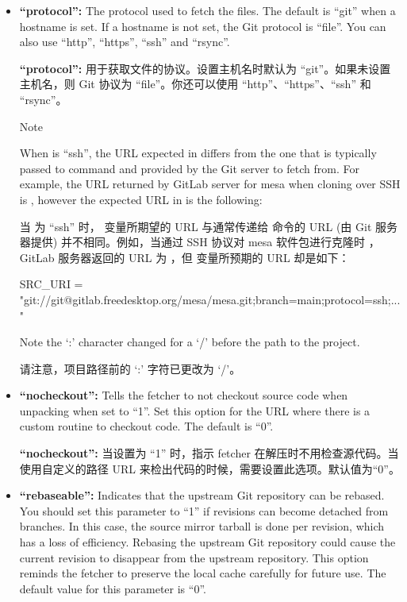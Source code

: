 \begin{itemize}
\setlength\itemsep{1.0em}
\item \textbf{``protocol'':} The protocol used to fetch the files. The default is ``git'' when a hostname is set. If a hostname is not set, the Git protocol is ``file''. You can also use ``http'', ``https'', ``ssh'' and ``rsync''.

\medskip
\textbf{``protocol'':} 用于获取文件的协议。设置主机名时默认为 ``git''。如果未设置主机名，则 Git 协议为 ``file''。你还可以使用 ``http''、``https''、``ssh'' 和 ``rsync''。

\medskip
\begin{noteblock}{Note}%

When  is ``ssh'', the URL expected in  differs from the one that is typically passed to  command and provided by the Git server to fetch from. For example, the URL returned by GitLab server for mesa when cloning over SSH is , however the expected URL in  is the following:

\medskip
当  为 ``ssh'' 时，  变量所期望的 URL 与通常传递给  命令的 URL (由 Git 服务器提供) 并不相同。例如，当通过 SSH 协议对 mesa 软件包进行克隆时 ，GitLab 服务器返回的 URL 为 ，但  变量所预期的 URL 却是如下：

\medskip
\begin{pyglist}
SRC_URI = "git://git@gitlab.freedesktop.org/mesa/mesa.git;branch=main;protocol=ssh;..."
\end{pyglist}

\medskip
Note the `:' character changed for a `/' before the path to the project.

\medskip
请注意，项目路径前的 `:' 字符已更改为 `/'。
\end{noteblock}

\item \textbf{``nocheckout'':} Tells the fetcher to not checkout source code when unpacking when set to ``1''. Set this option for the URL where there is a custom routine to checkout code. The default is ``0''.

\medskip
\textbf{``nocheckout'':} 当设置为 ``1'' 时，指示 fetcher 在解压时不用检查源代码。当使用自定义的路径 URL 来检出代码的时候，需要设置此选项。默认值为“0”。

\item \textbf{``rebaseable'':} Indicates that the upstream Git repository can be rebased\footnotemark[1]. You should set this parameter to ``1'' if revisions can become detached from branches. In this case, the source mirror tarball is done per revision, which has a loss of efficiency. Rebasing the upstream Git repository could cause the current revision to disappear from the upstream repository. This option reminds the fetcher to preserve the local cache carefully for future use. The default value for this parameter is ``0''.


\end{itemize}

